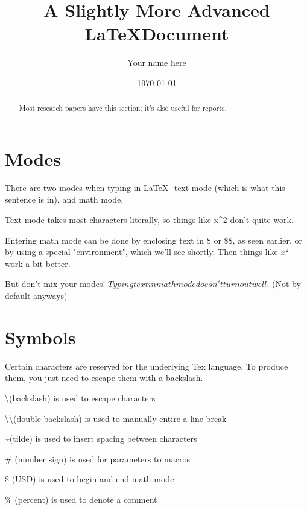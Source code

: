 \documentclass{article}
\author{Your name here}
\title{A Slightly More Advanced \LaTeX Document}
\date{\today}
\begin{document}
\maketitle
\newpage
\tableofcontents
\newpage



\begin{abstract}
    Most research papers have this section; it's also useful for reports.
\end{abstract}


\section{Modes}
    There are two modes when typing in \LaTeX - text mode (which is what this sentence is in), and math mode.
    
    Text mode takes most characters literally, so things like x^2 don't quite work.
    
    Entering math mode can be done by enclosing text in \$ or \$\$, as seen earlier, or by using a special "environment", which we'll see shortly. Then things like $x^2$ work a bit better.
    
    But don't mix your modes! $Typing text in math mode doesn't turn out well.$ (Not by default anyways)


\section{Symbols}
    Certain characters are reserved for the underlying Tex language. To produce them, you just need to escape them with a backslash.

    \textbackslash (backslash) is used to escape characters
    
    \textbackslash\textbackslash (double backslash) is used to manually entire a line break
    
    \textasciitilde (tilde) is used to insert spacing between characters
    
    \# (number sign) is used for parameters to macros
    
    \$ (USD) is used to begin and end math mode
    
    \% (percent) is used to denote a comment
    
\end{document}
